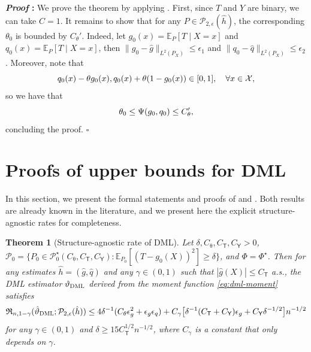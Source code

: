 \documentclass{article}
\def\eps{{\epsilon}}
\def\gP{{\mathcal{P}}}
\def\gX{{\mathcal{X}}}
\newcommand{\E}{\mathbb{E}}
\newtheorem{theorem}{Theorem}[section]
\renewenvironment{proof}{\noindent\textbf{\textit{Proof }:}}{\hfill$\square$}
\newcommand{\dml}{\textsc{DML}}
\begin{document}
\begin{proof}
    We prove the theorem by applying . First, since $T$ and $Y$ are binary, we can take $C=1$. It remains to show that for any $P\in\gP_{2,\eps}(\hat{h})$, the corresponding $\theta_0$ is bounded by $C_\theta'$. Indeed, let $g_0(x)=\E_{P}[T\mid X=x]$ and $q_0(x)=\E_{P}[T\mid X=x]$, then $\|g_0-\hat{g}\|_{L^2(P_X)}\leq\eps_1$ and $\|q_0-\hat{q}\|_{L^2(P_X)}\leq\eps_2$. Moreover, note that
    \begin{equation}
        \notag
        q_0(x) - \theta g_0(x), q_0(x) + \theta (1-g_0(x)) \in [0,1],\quad\forall x\in\gX,
    \end{equation}
    so we have that
    \begin{equation}
        \notag
        \theta_0 \leq \Psi(g_0,q_0) \leq C_{\theta}',
    \end{equation}
    concluding the proof.
\end{proof}

\section{Proofs of upper bounds for DML}

\label{sec:dml-upper-bound-proof}

In this section, we present the formal statements and proofs of  and . Both results are already known in the literature, and we present here the explicit structure-agnostic rates for completeness.

\begin{theorem}[Structure-agnostic rate of DML]
\label{cor:dml-upper-bound}
    Let $\delta,C_{\uptheta},C_{\mathsf{T}},C_{\mathsf{Y}}>0$, $\gP_0 = \{P_0\in\gP_0^{\star}(C_{\uptheta},C_{\mathsf{T}},C_{\mathsf{Y}}): \E_{P_0}[(T-g_0(X))^2]\geq \delta\}$, and $\Phi=\Phi^{\star}$. %
    Then for any estimates $\hat{h}=(\hat{g},\hat{q})$ and any $\gamma\in(0,1)$ such that $|\hat{g}(X)|\leq C_{\mathsf{T}}$ a.s., the DML estimator $\vartheta_{\dml}$ derived from the moment function \cref{eq:dml-moment} satisfies $$\mathfrak{R}_{n,1-\gamma}(\hat{\vartheta}_{\dml};\gP_{2,\eps}(\hat{h}))\leq 4\delta^{-1}(C_{\theta}\eps_g^2+\eps_g\eps_q) + C_{\gamma}\big[\delta^{-1}(C_{\mathsf{T}}+C_{\mathsf{Y}})\eps_g + C_{\mathsf{Y}}\delta^{-1/2} \big] n^{-1/2}$$ for any $\gamma\in(0,1)$ and $\delta\geq 15C_{\mathsf{T}}^{1/2}n^{-1/2}$, where $C_{\gamma}$ is a constant that only depends on $\gamma$.
\end{theorem}
\end{document}
